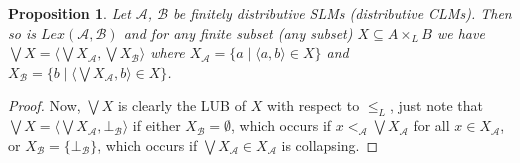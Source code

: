 \documentclass[a4paper]{elsarticle}
\newtheorem{proposition}{Proposition}
\newcommand{\1}{\mathbf{1}}
\begin{document}
\begin{proposition}\label{def:lexBI}
Let $\mathcal{A}$, $\mathcal{B}$ be finitely distributive SLMs (distributive CLMs).
Then so is $Lex(\mathcal{A}, \mathcal{B})$ and for any finite subset (any subset) $X \subseteq A \times_L B$ 
we have $\bigvee X = \langle \bigvee X_\mathcal{A}, \bigvee X_\mathcal{B} \rangle$ 
where $X_\mathcal{A} = \{ a \mid \langle a, b \rangle \in X\}$
and $X_\mathcal{B} = \{ b \mid \langle \bigvee X_\mathcal{A}, b \rangle \in X\}$.
\end{proposition}
\begin{proof}
	Now, $\bigvee X$ is clearly the LUB of $X$ with respect to $\leq_L$,
	just note that $\bigvee X =  \langle \bigvee X_\mathcal{A}, \bot_\mathcal{B} \rangle$ if 
	either $X_\mathcal{B} = \emptyset$, which occurs if $x <_\mathcal{A} \bigvee X_\mathcal{A}$ for all 
	$x \in X_\mathcal{A}$, or $X_\mathcal{B} =  \{\bot_\mathcal{B}\}$, which occurs if 
	$\bigvee X_\mathcal{A} \in X_\mathcal{A}$ is collapsing. 


\end{proof}
\end{document}
